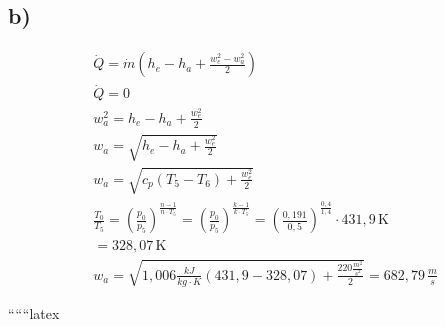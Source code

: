 

\subsection*{b)}

\begin{align*}
&\dot{Q} = \dot{m} \left( h_e - h_a + \frac{w_e^2 - w_a^2}{2} \right) \\
&\dot{Q} = 0 \\
&w_a^2 = h_e - h_a + \frac{w_e^2}{2} \\
&w_a = \sqrt{h_e - h_a + \frac{w_e^2}{2}} \\
&w_a = \sqrt{c_p (T_5 - T_6) + \frac{w_e^2}{2}} \\
&\frac{T_0}{T_5} = \left( \frac{p_0}{p_5} \right)^{\frac{n-1}{n \cdot T_5}} = \left( \frac{p_0}{p_5} \right)^{\frac{k-1}{k \cdot T_5}} = \left( \frac{0,191}{0,5} \right)^{\frac{0,4}{1,4}} \cdot 431,9 \, \text{K} \\
&= 328,07 \, \text{K} \\
&w_a = \sqrt{1,006 \frac{kJ}{kg \cdot K} (431,9 - 328,07) + \frac{220 \frac{m^2}{s^2}}{2}} = 682,79 \, \frac{m}{s}
\end{align*}

``````latex